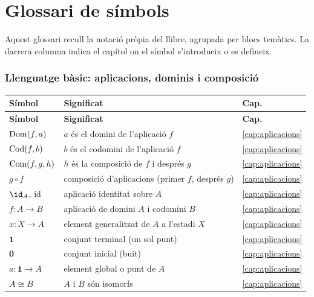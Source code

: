 \chapter*{Glossari de símbols}
\label{cap:glossari-simbols}

Aquest glossari recull la notació pròpia del llibre, agrupada per blocs
temàtics. La darrera columna indica el capítol on el símbol s'introdueix o es
defineix.

\begingroup
\renewcommand{\arraystretch}{1.35}

\subsection*{Llenguatge bàsic: aplicacions, dominis i composició}

\noindent
\begin{longtable}{@{}p{}p{}p{}@{}}
\toprule
\textbf{Símbol} & \textbf{Significat} & \textbf{Cap.}\\
\midrule
\endfirsthead
\toprule
\textbf{Símbol} & \textbf{Significat} & \textbf{Cap.}\\
\midrule
\endhead
\bottomrule
\endfoot
\(\operatorname{Dom}(f,a)\) & \(a\) és el domini de l'aplicació \(f\) & \ref{cap:aplicacions}\\
\(\operatorname{Cod}(f,b)\) & \(b\) és el codomini de l'aplicació \(f\) & \ref{cap:aplicacions}\\
\(\operatorname{Com}(f,g,h)\) & \(h\) és la composició de \(f\) i després \(g\) & \ref{cap:aplicacions}\\
\(g\circ f\) & composició d'aplicacions (primer \(f\), després \(g\)) & \ref{cap:aplicacions}\\
\(\id_A\), \(\mathrm{id}\) & aplicació identitat sobre \(A\) & \ref{cap:aplicacions}\\
\(f\colon A\to B\) & aplicació de domini \(A\) i codomini \(B\) & \ref{cap:aplicacions}\\
\(x\colon X\to A\) & element generalitzat de \(A\) a l'estadi \(X\) & \ref{cap:aplicacions}\\
\(\mathbf1\) & conjunt terminal (un sol punt) & \ref{cap:aplicacions}\\
\(\mathbf0\) & conjunt inicial (buit) & \ref{cap:aplicacions}\\
\(a\colon\mathbf1\to A\) & element global o punt de \(A\) & \ref{cap:aplicacions}\\
\(A\cong B\) & \(A\) i \(B\) són isomorfs & \ref{cap:aplicacions}\\
\end{longtable}

